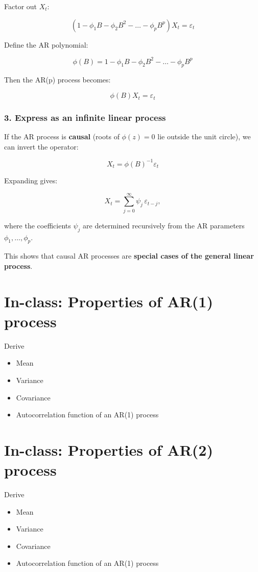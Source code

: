\documentclass[
  11pt,
  a4paper,
]{report}
\begin{document}
Factor out \(X_t\):

\[(1 - \phi_1 B - \phi_2 B^2 - \dots - \phi_p B^p) X_t = \varepsilon_t\]

Define the AR polynomial:

\[\phi(B) = 1 - \phi_1 B - \phi_2 B^2 - \dots - \phi_p B^p\]

Then the AR(p) process becomes:

\[\phi(B) X_t = \varepsilon_t\]

\subsubsection{3. Express as an infinite linear
process}\label{express-as-an-infinite-linear-process}

If the AR process is \textbf{causal} (roots of \(\phi(z)=0\) lie outside
the unit circle), we can invert the operator:

\[X_t = \phi(B)^{-1} \varepsilon_t\]

Expanding gives:

\[X_t = \sum_{j=0}^{\infty} \psi_j \, \varepsilon_{t-j},\]

where the coefficients \(\psi_j\) are determined recursively from the AR
parameters \(\phi_1, \dots, \phi_p\).

This shows that causal AR processes are \textbf{special cases of the
general linear process}.

\section{In-class: Properties of AR(1)
process}\label{in-class-properties-of-ar1-process}

Derive

\begin{itemize}
\item
  Mean
\item
  Variance
\item
  Covariance
\item
  Autocorrelation function of an AR(1) process
\end{itemize}

\section{In-class: Properties of AR(2)
process}\label{in-class-properties-of-ar2-process}

Derive

\begin{itemize}
\item
  Mean
\item
  Variance
\item
  Covariance
\item
  Autocorrelation function of an AR(1) process
\end{itemize}
\end{document}
